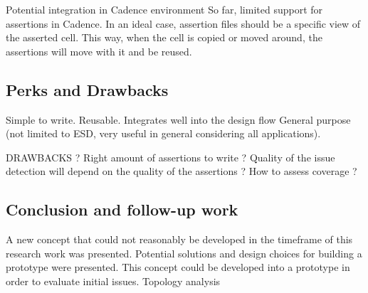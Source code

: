 Potential integration in Cadence environment
So far, limited support for assertions in Cadence.
In an ideal case, assertion files should be a specific view of the asserted cell.
This way, when the cell is copied or moved around, the assertions will move with it and be reused.

\subsection{Perks and Drawbacks}

Simple to write.
Reusable.
Integrates well into the design flow
General purpose (not limited to ESD, very useful in general considering all applications).

DRAWBACKS ?
Right amount of assertions to write ?
Quality of the issue detection will depend on the quality of the assertions ?
How to assess coverage ?


\subsection{Conclusion and follow-up work}

A new concept that could not reasonably be developed in the timeframe of this research work was presented.
Potential solutions and design choices for building a prototype were presented.
This concept could be developed into a prototype in order to evaluate initial issues.
Topology analysis
